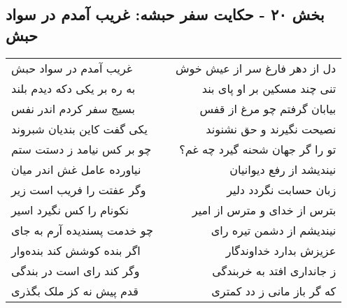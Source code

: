 \begin{center}
\section*{بخش ۲۰ - حکایت سفر حبشه: غریب آمدم در سواد حبش}
\label{sec:020}
\begin{longtable}{l p{0.5cm} r}
غریب آمدم در سواد حبش
&&
دل از دهر فارغ سر از عیش خوش
\\
به ره بر یکی دکه دیدم بلند
&&
تنی چند مسکین بر او پای بند
\\
بسیج سفر کردم اندر نفس
&&
بیابان گرفتم چو مرغ از قفس
\\
یکی گفت کاین بندیان شبروند
&&
نصیحت نگیرند و حق نشنوند
\\
چو بر کس نیامد ز دستت ستم
&&
تو را گر جهان شحنه گیرد چه غم؟
\\
نیاورده عامل غش اندر میان
&&
نیندیشد از رفع دیوانیان
\\
وگر عفتت را فریب است زیر
&&
زبان حسابت نگردد دلیر
\\
نکونام را کس نگیرد اسیر
&&
بترس از خدای و مترس از امیر
\\
چو خدمت پسندیده آرم به جای
&&
نیندیشم از دشمن تیره رای
\\
اگر بنده کوشش کند بنده‌وار
&&
عزیزش بدارد خداوندگار
\\
وگر کند رای است در بندگی
&&
ز جانداری افتد به خربندگی
\\
قدم پیش نه کز ملک بگذری
&&
که گر باز مانی ز دد کمتری
\\
\end{longtable}
\end{center}
